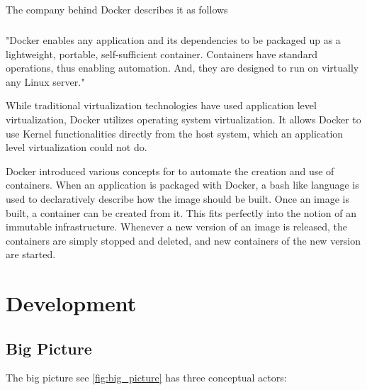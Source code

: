 The company behind Docker describes it as follows

\paragraph{}{"Docker enables any application and its dependencies to be packaged up as a
lightweight, portable, self-sufficient container. Containers have standard
operations, thus enabling automation. And, they are designed to run on
virtually any Linux server."\newline}

While traditional virtualization technologies have used application level
virtualization, Docker utilizes operating system virtualization. It allows
Docker to use Kernel functionalities directly from the host system, which
an application level virtualization could not do.

Docker introduced various concepts for to automate the creation and use of
containers. When an application is packaged with Docker, a bash like language
is used to declaratively describe how the image should be built. Once an image
is built, a container can be created from it. This fits perfectly into the
notion of an immutable infrastructure. Whenever a new version of an image is
released, the containers are simply stopped and deleted, and new containers of
the new version are started.

\chapter{Development}

\section{Big Picture}

The big picture see \ref{fig:big_picture} has three conceptual actors:

